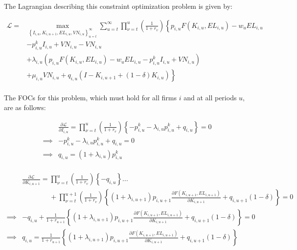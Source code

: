 \documentclass[letterpaper,12pt]{article}
\theoremstyle{definition}
\begin{document}
\begin{spacing}{1.5}
The Lagrangian describing this constraint optimization problem is given by:

\begin{equation}
\label{eqn:firm_lagrange}
\begin{split}
\mathcal{L} = &  \max_{\left\{I_{i,u},K_{i,u+1},EL_{i,u},VN_{i,u}\right\}_{u=t}^{\infty}} \sum_{u=t}^{\infty} \prod_{\nu=t}^{u} \left(\frac{1}{1+r_{v}}\right) \left\{ p_{i,u}F(K_{i,u},EL_{i,u}) - w_{u}EL_{i,u} \right.\\
       & \left. -p^{k}_{i,u}I_{i,u} +VN_{i,u} - VN_{i,u} \right. \\
       &+\left. \lambda_{i,u}(p_{i,u}F(K_{i,u},EL_{i,u}) - w_{u}EL_{i,u} -p^{k}_{i,u}I_{i,u} +VN_{i,u}) \right. \\
       &+ \left. \mu_{i,u}VN_{i,u} + q_{i,u}(I - K_{i,u+1} + (1-\delta)K_{i,u})\right\} \\
\end{split}
\end{equation}

The FOCs for this problem, which must hold for all firms $i$ and at all periods $u$, are as follows:

\begin{equation}
\label{eqn:lagrange_foc_i}
\begin{split}
& \frac{\partial \mathcal{L}}{\partial I_{i,u}} = \prod_{\nu=t}^{u} \left(\frac{1}{1+r_{v}}\right) \left\{ -p^{k}_{i,u} - \lambda_{i,u}p^{k}_{i,u} + q_{i,u} \right\} = 0 \\
\implies &   -p^{k}_{i,u} - \lambda_{i,u}p^{k}_{i,u} + q_{i,u} = 0 \\
\implies & q_{i,u} = (1+\lambda_{i,u})p^{k}_{i,u} \\
\end{split}
\end{equation}


\begin{equation}
\label{eqn:lagrange_foc_k}
\begin{split}
& \frac{\partial \mathcal{L}}{\partial K_{i,u+1}} =   \prod_{\nu=t}^{u} \left(\frac{1}{1+r_{v}}\right) \left\{- q_{i,u} \right\} ... \\
& \quad\quad\quad\quad + \prod_{\nu=t}^{u+1} \left(\frac{1}{1+r_{v}}\right) \left\{(1+\lambda_{i,u+1})p_{i,u+1}\frac{\partial F(K_{i,u+1},EL_{i,u+1})}{\partial K_{i,u+1}} + q_{i,u+1}(1-\delta) \right\} = 0 \\
\implies &  - q_{i,u} + \frac{1}{1+r_{u+1}} \left\{(1+\lambda_{i,u+1})p_{i,u+1}\frac{\partial F(K_{i,u+1},EL_{i,u+1})}{\partial K_{i,u+1}}+ q_{i,u+1}(1-\delta)  \right\} = 0 \\
\implies & q_{i,u} =  \frac{1}{1+r_{u+1}} \left\{(1+\lambda_{i,u+1})p_{i,u+1}\frac{\partial F(K_{i,u+1},EL_{i,u+1})}{\partial K_{i,u+1}}+ q_{i,u+1}(1-\delta)  \right\}  \\
\end{split}
\end{equation}


\end{spacing}
\end{document}
